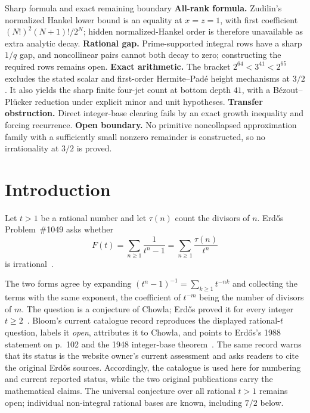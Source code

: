 \documentclass[11pt]{article}
\begin{document}
\begin{paperresult}{Sharp formula and exact remaining boundary}
\textbf{All-rank formula.} Zudilin's normalized Hankel lower bound is an
equality at $x=z=1$, with first coefficient $(N!)^2(N+1)!/2^N$; hidden
normalized-Hankel order is therefore unavailable as extra analytic decay.
\textbf{Rational gap.} Prime-supported integral rows have a sharp $1/q$
gap, and noncollinear pairs cannot both decay to zero; constructing the
required rows remains open.
\textbf{Exact arithmetic.} The bracket $2^{64}<3^{41}<2^{65}$ excludes the
stated scalar and first-order Hermite--Pad\'e height mechanisms at $3/2$.
It also yields the sharp finite four-jet count at bottom depth $41$, with a
B\'ezout--Pl\"ucker reduction under explicit minor and unit hypotheses.
\textbf{Transfer obstruction.} Direct integer-base clearing fails by an exact
growth inequality and forcing recurrence.  \textbf{Open boundary.} No
primitive noncollapsed approximation family with a sufficiently small
nonzero remainder is constructed, so no irrationality at $3/2$ is proved.
\end{paperresult}

\section{Introduction}\label{sec:problem}

Let $t>1$ be a rational number and let $\tau(n)$ count the divisors of $n$.
Erd\H{o}s Problem~\#1049 asks whether
\[
 F(t)=\sum_{n\ge1}\frac{1}{t^{n}-1}=\sum_{n\ge1}\frac{\tau(n)}{t^{n}}
\]
is irrational~\cite[p.~102]{erdos1988}.

The two forms agree by expanding
$(t^{n}-1)^{-1}=\sum_{k\ge1}t^{-nk}$ and collecting the terms with the same
exponent, the coefficient of $t^{-m}$ being the number of divisors of $m$.
The question is a conjecture of Chowla; Erd\H{o}s proved it for every integer
$t\ge2$~\cite{erdos1948}.  Bloom's current catalogue record reproduces the
displayed rational-\(t\) question, labels it \emph{open}, attributes it to
Chowla, and points to Erd\H{o}s's 1988 statement on p.~102 and the 1948
integer-base theorem~\cite{erdosproblems}.  The same record warns that its
status is the website owner's current assessment and asks readers to cite the
original Erd\H{o}s sources.  Accordingly, the catalogue is used here for
numbering and current reported status, while the two original publications
carry the mathematical claims.  The universal conjecture over all rational
$t>1$ remains open; individual non-integral rational bases are known, including
$7/2$ below.
\end{document}
